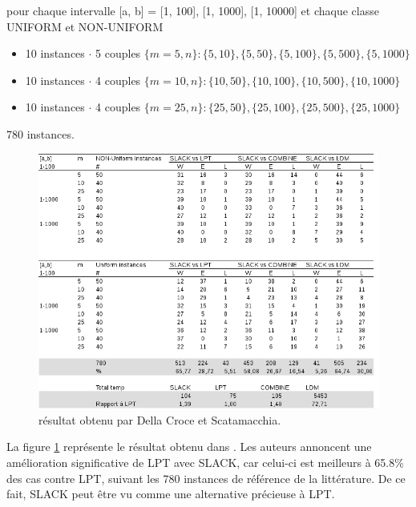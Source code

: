 \documentclass[a4paper,12pt]{report}
\theoremstyle{plain}				%
\theoremstyle{definition}				%
\begin{document}
pour chaque intervalle [a, b] = [1, 100], [1, 1000], [1, 10000] et
  chaque classe UNIFORM et NON-UNIFORM 
\begin{itemize}
\item 10 instances $\cdot$ 5 couples $\{m=5,n\}:\{5,10\},\{5,50\},\{5,100\},\{5,500\},\{5,1000\}$
\item 10 instances $\cdot$ 4 couples $\{m=10, n\}:\{10,50\},\{10,100\},\{10,500\},\{10,1000\}$
\item 10 instances $\cdot$ 4 couples $\{m=25,n\}:\{25,50\},\{25,100\},\{25,500\},\{25,1000\}$
\end{itemize}  

780 instances.

\begin{figure}
{\centering
\includegraphics[width=\columnwidth]{1_Resultat_De_DCS.png}
\caption{résultat obtenu par Della Croce et Scatamacchia.}
\label{fig:resultatDellaCroceScatamacchia}
\par}
\end{figure}

La figure \ref{fig:resultatDellaCroceScatamacchia} représente le résultat obtenu 
  dans \cite{della2020longest}. 
Les auteurs annoncent une amélioration significative de LPT avec SLACK, 
  car celui-ci est meilleurs à 65.8\% des cas contre LPT, suivant les 780 instances 
  de référence de la littérature. De ce fait, SLACK peut être vu comme une alternative précieuse 
  à LPT.
  
\end{document}
